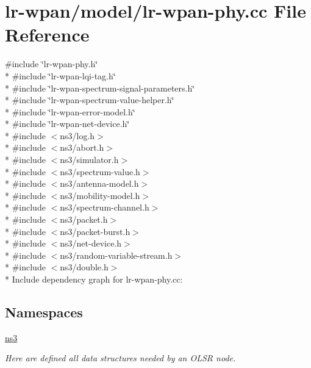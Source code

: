 \hypertarget{lr-wpan-phy_8cc}{}\section{lr-\/wpan/model/lr-\/wpan-\/phy.cc File Reference}
\label{lr-wpan-phy_8cc}
{\ttfamily \#include \char`\"{}lr-\/wpan-\/phy.\+h\char`\"{}}\\*
{\ttfamily \#include \char`\"{}lr-\/wpan-\/lqi-\/tag.\+h\char`\"{}}\\*
{\ttfamily \#include \char`\"{}lr-\/wpan-\/spectrum-\/signal-\/parameters.\+h\char`\"{}}\\*
{\ttfamily \#include \char`\"{}lr-\/wpan-\/spectrum-\/value-\/helper.\+h\char`\"{}}\\*
{\ttfamily \#include \char`\"{}lr-\/wpan-\/error-\/model.\+h\char`\"{}}\\*
{\ttfamily \#include \char`\"{}lr-\/wpan-\/net-\/device.\+h\char`\"{}}\\*
{\ttfamily \#include $<$ns3/log.\+h$>$}\\*
{\ttfamily \#include $<$ns3/abort.\+h$>$}\\*
{\ttfamily \#include $<$ns3/simulator.\+h$>$}\\*
{\ttfamily \#include $<$ns3/spectrum-\/value.\+h$>$}\\*
{\ttfamily \#include $<$ns3/antenna-\/model.\+h$>$}\\*
{\ttfamily \#include $<$ns3/mobility-\/model.\+h$>$}\\*
{\ttfamily \#include $<$ns3/spectrum-\/channel.\+h$>$}\\*
{\ttfamily \#include $<$ns3/packet.\+h$>$}\\*
{\ttfamily \#include $<$ns3/packet-\/burst.\+h$>$}\\*
{\ttfamily \#include $<$ns3/net-\/device.\+h$>$}\\*
{\ttfamily \#include $<$ns3/random-\/variable-\/stream.\+h$>$}\\*
{\ttfamily \#include $<$ns3/double.\+h$>$}\\*
Include dependency graph for lr-\/wpan-\/phy.cc\+:
\subsection*{Namespaces}
\begin{DoxyCompactItemize}
\item 
 \hyperlink{namespacens3}{ns3}
\begin{DoxyCompactList}\small\item\em Here are defined all data structures needed by an O\+L\+SR node. \end{DoxyCompactList}\end{DoxyCompactItemize}
